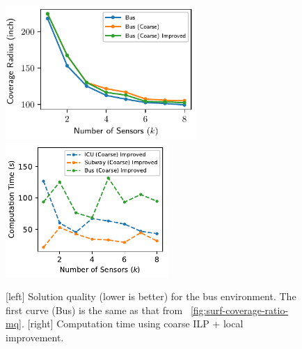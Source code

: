 \begin{figure}[!ht]
    \centering
    \includegraphics[width=.46\columnwidth, height=2in]{chapters/surf/fig/result-bus-mq-eps-converted-to.pdf}
    \includegraphics[width=.46\columnwidth, height=2in]{chapters/surf/fig/result-time-mq-coarse-eps-converted-to.pdf}    
    \caption[Solution quality and computation time for ILP + lcoal improvement on the bus environment]
    { [left] Solution quality (lower is better) for the bus environment. 
    The first curve (Bus) is the same as that from ~\ref{fig:surf-coverage-ratio-mq}. 
    [right] Computation time using coarse ILP + local improvement.}
\label{fig:surf-coverage-ratio-cu}
\end{figure}

